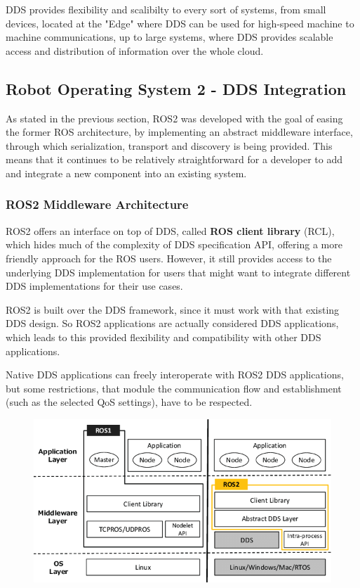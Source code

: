 DDS provides flexibility and scalibilty to every sort of systems, from small devices, located at the "Edge" where DDS can be used for high-speed machine to machine communications, up to large systems, where DDS provides scalable access and distribution of information over the whole cloud.


\subsection{Robot Operating System 2 - DDS Integration}

As stated in the previous section, ROS2 was developed with the goal of easing the former ROS architecture, by implementing an abstract middleware interface, through which serialization, transport and discovery is being provided. This means that it continues to be relatively straightforward for a developer to add and integrate a new component into an existing system.

\subsubsection{ROS2 Middleware Architecture}

ROS2 offers an interface on top of DDS, called \textbf{ROS client library} (RCL), which hides much of the complexity of DDS specification API, offering a more friendly approach for the ROS users. However, it still provides access to the underlying DDS implementation for users that might want to integrate different DDS implementations for their use cases.

ROS2 is built over the DDS framework, since it must work with that existing DDS design. So ROS2 applications are actually considered DDS applications, which leads to this provided flexibility and compatibility with other DDS applications.
                
Native DDS applications can freely interoperate with ROS2 DDS applications, but some restrictions, that module the communication flow and establishment (such as the selected QoS settings), have to be respected.
                
\begin{figure}[H]
    \centering
     \includegraphics[width=0.5\linewidth]{images/ROS2-architecture.png}
\end{figure}

